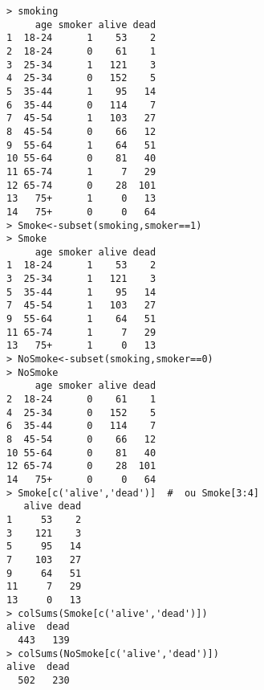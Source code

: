 \documentclass[10pt,dvipsnames, dvips, svgnames]{article}
\begin{document}
\begin{lstlisting}
> smoking
     age smoker alive dead
1  18-24      1    53    2
2  18-24      0    61    1
3  25-34      1   121    3
4  25-34      0   152    5
5  35-44      1    95   14
6  35-44      0   114    7
7  45-54      1   103   27
8  45-54      0    66   12
9  55-64      1    64   51
10 55-64      0    81   40
11 65-74      1     7   29
12 65-74      0    28  101
13   75+      1     0   13
14   75+      0     0   64
> Smoke<-subset(smoking,smoker==1)
> Smoke
     age smoker alive dead
1  18-24      1    53    2
3  25-34      1   121    3
5  35-44      1    95   14
7  45-54      1   103   27
9  55-64      1    64   51
11 65-74      1     7   29
13   75+      1     0   13
> NoSmoke<-subset(smoking,smoker==0)
> NoSmoke
     age smoker alive dead
2  18-24      0    61    1
4  25-34      0   152    5
6  35-44      0   114    7
8  45-54      0    66   12
10 55-64      0    81   40
12 65-74      0    28  101
14   75+      0     0   64
> Smoke[c('alive','dead')]  #  ou Smoke[3:4]
   alive dead
1     53    2
3    121    3
5     95   14
7    103   27
9     64   51
11     7   29
13     0   13
> colSums(Smoke[c('alive','dead')])
alive  dead 
  443   139 
> colSums(NoSmoke[c('alive','dead')])
alive  dead 
  502   230 
\end{lstlisting}
\end{document}
